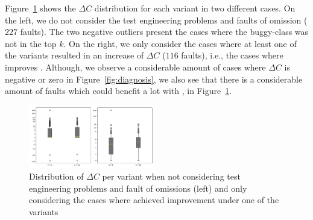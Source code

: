 \documentclass{article}
\begin{document}
Figure~\ref{fig:boxplot} shows the $\Delta{}C$ distribution for each
variant in two different cases. On the left, we do not consider the
test engineering problems and faults of omission ($227$ faults). The two negative 
outliers present the cases where the buggy-class was not in the top
$k$. On the right, we only consider the cases where at least one 
of the variants resulted in an increase of $\Delta{}C$ ($116$ faults), i.e., the 
cases where \ds{} improves \sfl. Although, we observe
a considerable amount of cases where $\Delta{}C$ is negative or zero in Figure~\ref{fig:diagnosis}, we also see that there is a considerable amount of faults which could benefit a lot with , in Figure~\ref{fig:boxplot}.
\begin{figure}[h]
		\vspace{-0.2cm}
		\centering
		\includegraphics[width=0.49\textwidth]{figures/boxplot.pdf}
		\vspace{-0.6cm}
		
		\caption{Distribution of $\Delta{}C$ per variant when not considering 
		test engineering problems and fault of omissions (left) and only considering
		the cases where  achieved improvement under one of the variants}
		\label{fig:boxplot}
		\vspace{-0.2cm}
		
\end{figure}
\end{document}

